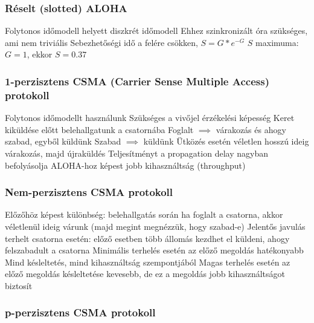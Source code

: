 \documentclass[12pt,a4paper]{article}
\begin{document}
\subsubsection{Réselt (slotted) ALOHA}

\begin{outline}
	\1 Folytonos időmodell helyett diszkrét időmodell
		\2 Ehhez szinkronizált óra szükséges, ami nem triviális
	\1 Sebezhetőségi idő a felére csökken, $S=G*e^{-G}$
		\2 $S$ maximuma: $G=1$, ekkor $S=0.37$
\end{outline}

\pagebreak

\subsubsection{1-perzisztens CSMA (Carrier Sense Multiple Access) protokoll}

\begin{outline}
	\1 Folytonos időmodellt használunk
	\1 Szükséges a vivőjel érzékelési képesség
	\1 Keret kiküldése előtt belehallgatunk a csatornába
		\2 Foglalt $\implies$ várakozás és ahogy szabad, egyből küldünk
		\2 Szabad $\implies$ küldünk
	\1 Ütközés esetén véletlen hosszú ideig várakozás, majd újraküldés
	\1 Teljesítményt a propagation delay nagyban befolyásolja
	\1 ALOHA-hoz képest jobb kihasználtság (throughput)
\end{outline}

\subsubsection{Nem-perzisztens CSMA protokoll}

\begin{outline}
	\1 Előzőhöz képest különbség: belehallgatás során ha foglalt a csatorna, akkor véletlenül ideig várunk (majd megint megnézzük, hogy szabad-e)
	\1 Jelentős javulás terhelt csatorna esetén: előző esetben több állomás kezdhet el küldeni, ahogy felszabadult a csatorna
	\1 Minimális terhelés esetén az előző megoldás hatékonyabb
		\2 Mind késleltetés, mind kihasználtság szempontjából
	\1 Magas terhelés esetén az előző megoldás késleltetése kevesebb, de ez a megoldás jobb kihasználtságot biztosít
\end{outline}

\subsubsection{p-perzisztens CSMA protokoll}
\end{document}
